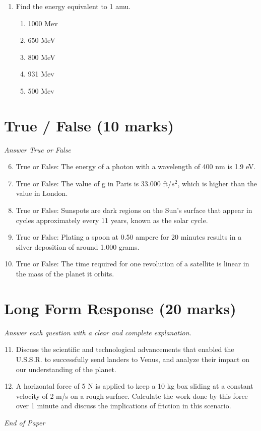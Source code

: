 \documentclass[12pt]{article}
\begin{document}
\begin{enumerate}[label=\arabic*.]
\begin{enumerate}[label=(\alph*)]
    \item frequency decreases, the wavelength increases, and the speed does not change
    \item frequency increases, the wavelength increases, and the speed decreases
    \item frequency increases, the wavelength does not change, and the speed increases
    \item frequency increases, the wavelength decreases, and the speed does not change
\end{enumerate}
\item Find the energy equivalent to 1 amu.
\begin{enumerate}[label=(\alph*)]
    \item 1000 Mev
    \item 650 MeV
    \item 800 MeV
    \item 931 Mev
    \item 500 Mev
\end{enumerate}
\end{enumerate}

\section*{True / False (10 marks)}
\textit{Answer True or False}
\begin{enumerate}[label=\arabic*.]
\setcounter{enumi}{5}
\item True or False: The energy of a photon with a wavelength of 400 nm is 1.9 eV.
\item True or False: The value of g in Paris is 33.000 ft/$s^2$, which is higher than the value in London.
\item True or False: Sunspots are dark regions on the Sun's surface that appear in cycles approximately every 11 years, known as the solar cycle.
\item True or False: Plating a spoon at 0.50 ampere for 20 minutes results in a silver deposition of around 1.000 grams.
\item True or False: The time required for one revolution of a satellite is linear in the mass of the planet it orbits.
\end{enumerate}

\section*{Long Form Response (20 marks)}
\textit{Answer each question with a clear and complete explanation.}
\begin{enumerate}[label=\arabic*.]
\setcounter{enumi}{10}
\item Discuss the scientific and technological advancements that enabled the U.S.S.R. to successfully send landers to Venus, and analyze their impact on our understanding of the planet.
\item A horizontal force of 5 N is applied to keep a 10 kg box sliding at a constant velocity of 2 m/s on a rough surface. Calculate the work done by this force over 1 minute and discuss the implications of friction in this scenario.
\end{enumerate}

\vfill
\noindent\textit{End of Paper}
\end{document}
